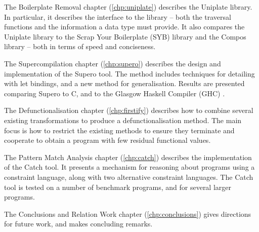 The Boilerplate Removal chapter (\ref{chp:uniplate}) describes the Uniplate library. In particular, it describes the interface to the library -- both the traversal functions and the information a data type must provide. It also compares the Uniplate library to the Scrap Your Boilerplate (SYB) library \cite{spj:syb} and the Compos library \cite{bringert:compos} -- both in terms of speed and conciseness.

The Supercompilation chapter (\ref{chp:supero}) describes the design and implementation of the Supero tool. The method includes techniques for detailing with let bindings, and a new method for generalisation. Results are presented comparing Supero to C, and to the Glasgow Haskell Compiler (GHC) \cite{ghc}.

The Defunctionalisation chapter (\ref{chp:firstify}) describes how to combine several existing transformations to produce a defunctionalisation method. The main focus is how to restrict the existing methods to ensure they terminate and cooperate to obtain a program with few residual functional values.

The Pattern Match Analysis chapter (\ref{chp:catch}) describes the implementation of the Catch tool. It presents a mechanism for reasoning about programs using a constraint language, along with two alternative constraint languages. The Catch tool is tested on a number of benchmark programs, and for several larger programs.

The Conclusions and Relation Work chapter (\ref{chp:conclusions}) gives directions for future work, and makes concluding remarks.

